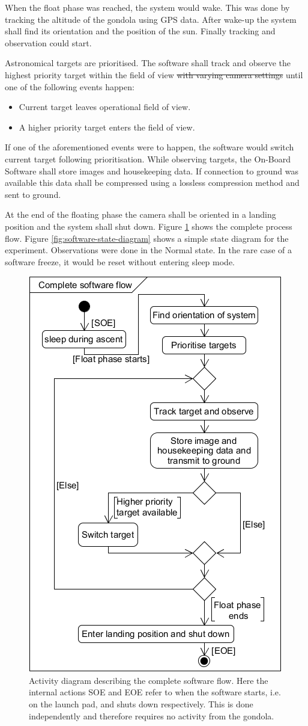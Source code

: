 When the float phase was reached, the system would wake. This was done by tracking the altitude of the gondola using GPS data. After wake-up the system shall find its orientation and the position of the sun. Finally tracking and observation could start.

Astronomical targets are prioritised. The software shall track and observe the highest priority target within the field of view \st{with varying camera settings} until one of the following events happen:

\begin{itemize}
    \item Current target leaves operational field of view.
    \item A higher priority target enters the field of view.
\end{itemize}

If one of the aforementioned events were to happen, the software would switch current target following prioritisation. While observing targets, the On-Board Software shall store images and housekeeping data. If connection to ground was available this data shall be compressed using a lossless compression method and sent to ground.

At the end of the floating phase the camera shall be oriented in a landing position and the system shall shut down. Figure \ref{fig:software-activity-diagram} shows the complete process flow. Figure \ref{fig:software-state-diagram} shows a simple state diagram for the experiment. Observations were done in the Normal state. In the rare case of a software freeze, it would be reset without entering sleep mode.

\begin{figure}[H]
    \centering
    \includegraphics[width=.5\textwidth]{4-experiment-design/img/software/activity-diagram.png}
    \caption{Activity diagram describing the complete software flow. Here the internal actions SOE and EOE refer to when the software starts, i.e. on the launch pad, and shuts down respectively. This is done independently and therefore requires no activity from the gondola.}
    \label{fig:software-activity-diagram}
\end{figure}

